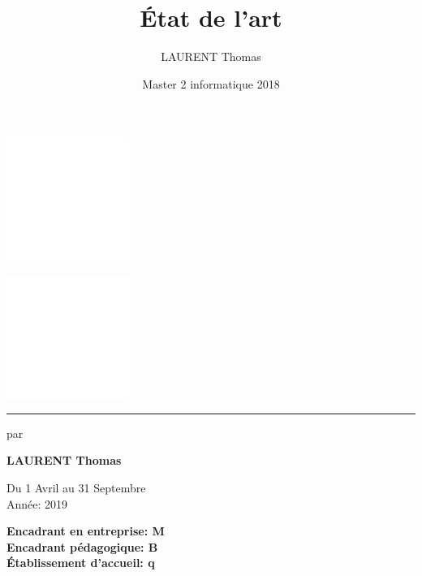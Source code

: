 \documentclass[french, 12pt]{report}
\title{État de l'art}
\author{LAURENT Thomas}
\date{Master 2 informatique 2018}
\newcommand{\sepline}{\textcolor{gray}{\noindent\rule{14cm}{0.1pt}}}
\begin{document}
\begin{titlepage}

\begin{multicols}{2}
\begin{flushleft}
    \includegraphics[width=4cm]{img/entreprise.jpg}
\end{flushleft}
\begin{flushright}
    \includegraphics[width=4cm]{img/artois.jpg}
\end{flushright}
\end{multicols}

\begin{center}
 
	   \sepline
       \vspace{3cm}
 
       \vspace{3cm}
	   
	   \vspace{1.5cm}
	   par 
       \vspace{1.5cm}
 
       \textbf{LAURENT Thomas}
 
       \vfill
 
       \vspace{0.6cm}
 
       Du 1 Avril au 31 Septembre\\
       Année: 2019
       
       \vspace{0.8cm}
       
       \textbf{Encadrant en entreprise: M\\}
       \textbf{Encadrant pédagogique: B\\}
       \textbf{Établissement d’accueil: q\\}
 
   \end{center}
\end{titlepage}
\pagebreak
\end{document}
